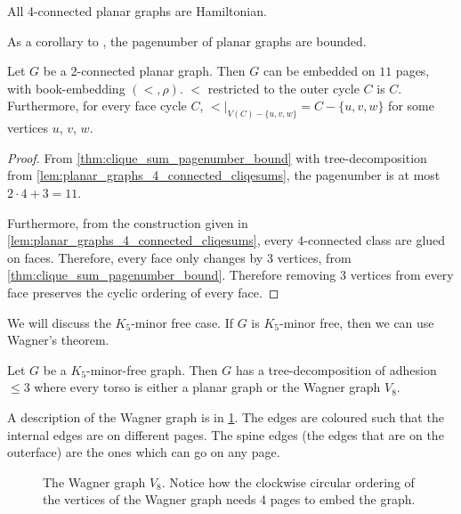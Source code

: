 \begin{theorem}\label{thm:4-connected_planar_ham_cycle}
	All 4-connected planar graphs are Hamiltonian.
\end{theorem}

As a corollary to \textcite{hickingbothamStackNumberCliqueSum2023}, the pagenumber of planar graphs are bounded.

\begin{theorem}\label{thm:Planar Graph Hickingbotham Bound}
	Let \(G\) be a 2-connected planar graph. Then $G$ can be embedded on $11$ pages, with book-embedding $(<, \rho)$. $<$ restricted to the outer cycle $C$ is $C$. Furthermore, for every face cycle $C$, $<|_{V(C) - \{u, v, w\}} = C - \{u, v, w\}$ for some vertices $u$, $v$, $w$. 
\end{theorem}
\begin{proof}
	From \cref{thm:clique_sum_pagenumber_bound} with tree-decomposition from \cref{lem:planar_graphs_4_connected_cliqesums}, the pagenumber is at most \(2 \cdot 4 + 3 = 11\).

	Furthermore, from the construction given in \cref{lem:planar_graphs_4_connected_cliqesums}, every $4$-connected class are glued on faces. Therefore, every face only changes by $3$ vertices, from \cref{thm:clique_sum_pagenumber_bound}. Therefore removing $3$ vertices from every face preserves the cyclic ordering of every face.
\end{proof}

We will discuss the \(K_5\)-minor free case. If \(G\) is \(K_5\)-minor free, then we can use Wagner's theorem.
\begin{theorem}\label{thm:WagnersTheorem}
	Let \(G\) be a \(K_5\)-minor-free graph. Then \(G\) has a tree-decomposition of adhesion $\leq 3$ where every torso is either a planar graph or the Wagner graph \(V_8\).
\end{theorem}
A description of the Wagner graph is in \cref{fig:wagner}. The edges are coloured such that the internal edges are on different pages. The spine edges (the edges that are on the outerface) are the ones which can go on any page.
\begin{figure}[h!]
	\centering
	\begin{tikzpicture}[thick,scale=2, every node/.style={scale=2}]
		
	\end{tikzpicture}
	\caption[Wagner graph]{The Wagner graph $V_8$. Notice how the clockwise circular ordering of the vertices of the Wagner graph needs 4 pages to embed the graph. }\label{fig:wagner}
\end{figure}

